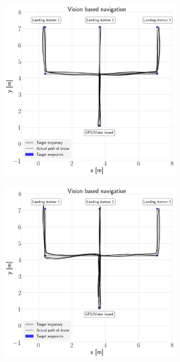 \documentclass[../Head/report.tex]{subfiles}
\begin{document}
\begin{figure}[H]
    \centering
    \begin{subfigure}[t]{.30\textwidth}
        \centering
        \includegraphics[width=\textwidth]{../Figures/vision_navigation/test1_full_pattern_board/2d_path.png}
        \caption{}
        \label{fig:vision_navigation_2d_path_full_board}
    \end{subfigure}
     \hspace{0.2em}
    \begin{subfigure}[t]{.30\textwidth}
        \centering
        \includegraphics[width=\textwidth]{../Figures/vision_navigation/test4_one_pattern_missing_markers_wear_board/2d_path.png}

\end{subfigure}
\end{figure}
\end{document}
